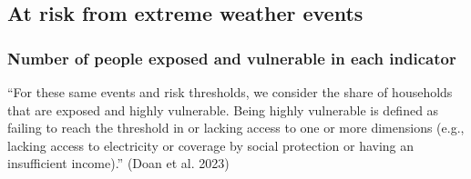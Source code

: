 \documentclass[
  letterpaper,
  DIV=11,
  numbers=noendperiod]{scrartcl}
\begin{document}
\subsection{At risk from extreme weather
events}\label{at-risk-from-extreme-weather-events}

\subsubsection{Number of people exposed and vulnerable in each
indicator}\label{number-of-people-exposed-and-vulnerable-in-each-indicator}

``For these same events and risk thresholds, we consider the share of
households that are exposed and highly vulnerable. Being highly
vulnerable is defined as failing to reach the threshold in or lacking
access to one or more dimensions (e.g., lacking access to electricity or
coverage by social protection or having an insufficient income).'' (Doan
et al. 2023)
\end{document}
